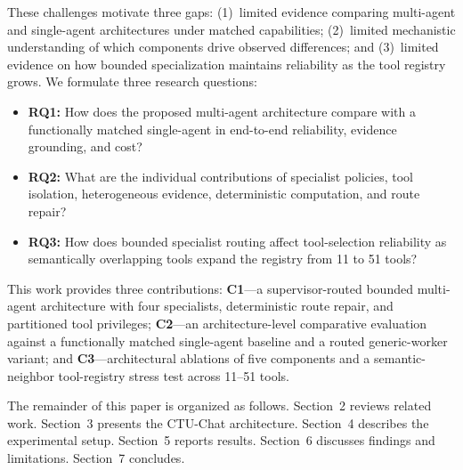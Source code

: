 These challenges motivate three gaps: (1)~limited evidence comparing multi-agent and single-agent architectures under matched capabilities; (2)~limited mechanistic understanding of which components drive observed differences; and (3)~limited evidence on how bounded specialization maintains reliability as the tool registry grows. We formulate three research questions:
\begin{itemize}
    \setlength{\itemsep}{1.5pt}
    \setlength{\parsep}{0pt}
    \setlength{\parskip}{0pt}
    \item \textbf{RQ1:} How does the proposed multi-agent architecture compare with a functionally matched single-agent in end-to-end reliability, evidence grounding, and cost?
    \item \textbf{RQ2:} What are the individual contributions of specialist policies, tool isolation, heterogeneous evidence, deterministic computation, and route repair?
    \item \textbf{RQ3:} How does bounded specialist routing affect tool-selection reliability as semantically overlapping tools expand the registry from 11 to 51 tools?
\end{itemize}

This work provides three contributions:
\textbf{C1}---a supervisor-routed bounded multi-agent architecture with four specialists, deterministic route repair, and partitioned tool privileges;
\textbf{C2}---an architecture-level comparative evaluation against a functionally matched single-agent baseline and a routed generic-worker variant; and
\textbf{C3}---architectural ablations of five components and a semantic-neighbor tool-registry stress test across 11--51 tools.

The remainder of this paper is organized as follows. Section~2 reviews related work. Section~3 presents the CTU-Chat architecture. Section~4 describes the experimental setup. Section~5 reports results. Section~6 discusses findings and limitations. Section~7 concludes.
